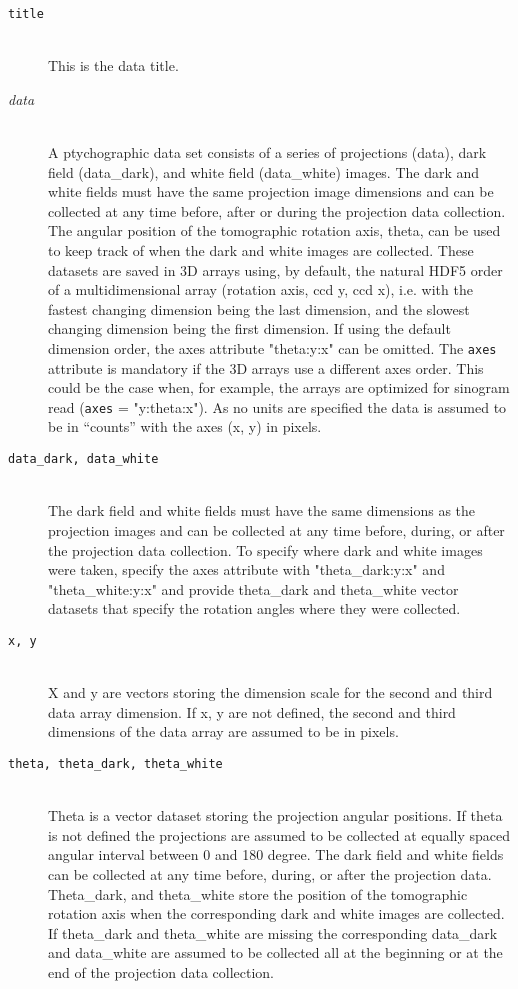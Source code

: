 \begin{description}
\item[\tt{title}] \hfill \\
{This is the data title.}

\item[\emph{data}] \hfill \\
{A ptychographic data set consists of a series of projections (data), dark field (data\_dark), and white field (data\_white) images. The dark and white fields must have the same projection image dimensions and can be collected at any time before, after or during the projection data collection. The angular position of the tomographic rotation axis, theta, can be used to keep track of when the dark and white images are collected.  These datasets are saved in 3D arrays using, by default, the natural HDF5 order of a multidimensional array (rotation axis, ccd y, ccd x), i.e. with the fastest changing dimension being the last dimension, and the slowest changing dimension being the first dimension. If using the default dimension order, the axes attribute "theta:y:x" can be omitted. The {\tt{axes}} attribute is mandatory if the 3D arrays use a different axes order. This could be the case when, for example, the arrays are optimized for sinogram read ({\tt{axes}} = "y:theta:x"). As no units are specified the data is assumed to be in ``counts'' with the axes (x, y) in pixels. }


\item[\tt{data\_dark, data\_white}] \hfill \\
{The dark field and white fields must have the same dimensions as the projection images and can be collected at any time before, during, or after the projection data collection.  To specify where dark and white images were taken, specify the axes attribute with "theta\_dark:y:x" and "theta\_white:y:x" and provide theta\_dark and theta\_white vector datasets that specify the rotation angles where they were collected.}

\item[\tt{x, y}] \hfill \\
{X and y are vectors storing the dimension scale for the second and third data array dimension. If x, y are not defined, the second and third dimensions of the data array are assumed to be in pixels.}

\item[\tt{theta, theta\_dark, theta\_white}] \hfill \\
{Theta is a vector dataset storing the projection angular positions.  If theta is not defined the projections are assumed to be collected at equally spaced angular interval between 0 and 180 degree.  The dark field and white fields can be collected at any time before, during, or after the projection data. Theta\_dark, and theta\_white store the position of the tomographic rotation axis when the corresponding dark and white images are collected. If theta\_dark and theta\_white are missing the corresponding data\_dark and data\_white are assumed to be collected all at the beginning or at the end of the projection data collection.}


\end{description}
